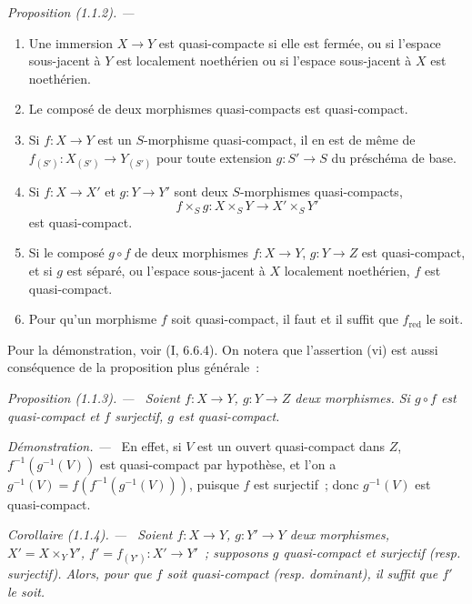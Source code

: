 \documentclass[10pt,oneside]{book}
\makeatletter
\newcommand{\setmanualcurrentlabel}[1]{\def\@currentlabel{#1}}
\newenvironment{proposition}[1][]{%
  \setmanualcurrentlabel{#1}\par\medskip\noindent\itshape Proposition (#1). ---\ }{\par}
\newenvironment{corollary}[1][]{%
  \setmanualcurrentlabel{#1}\par\medskip\noindent\itshape Corollaire (#1). ---\ }{\par}
\newenvironment{proof}{%
  \par\medskip\noindent\textit{Démonstration. ---\ }}{\par}
\makeatother
\begin{document}
\begin{proposition}[1.1.2]
\label{IV.1.1.2-fr}
\begin{enumerate}
  \item[(i)] Une immersion $X\to Y$ est quasi-compacte si elle est fermée, ou si
  l'espace sous-jacent à $Y$ est localement noethérien ou si l'espace
  sous-jacent à $X$ est noethérien.
  \item[(ii)] Le composé de deux morphismes quasi-compacts est quasi-compact.
  \item[(iii)] Si $f:X\to Y$ est un $S$-morphisme quasi-compact, il en est de même de
  $f_{(S')}:X_{(S')}\to Y_{(S')}$ pour toute extension $g:S'\to S$ du
  préschéma de base.
  \item[(iv)] Si $f:X\to X'$ et $g:Y\to Y'$ sont deux $S$-morphismes
  quasi-compacts,
  \[
    f\times_S g:X\times_S Y\to X'\times_S Y'
  \]
  est quasi-compact.
  \item[(v)] Si le composé $g\circ f$ de deux morphismes $f:X\to Y$, $g:Y\to Z$
  est quasi-compact, et si $g$ est séparé, ou l'espace sous-jacent à $X$
  localement noethérien, $f$ est quasi-compact.
  \item[(vi)] Pour qu'un morphisme $f$ soit quasi-compact, il faut et il suffit que
  $f_{\mathrm{red}}$ le soit.
\end{enumerate}
\end{proposition}

Pour la démonstration, voir (I, 6.6.4). On notera que l'assertion (vi) est
aussi conséquence de la proposition plus générale~:

\begin{proposition}[1.1.3]
\label{IV.1.1.3-fr}
Soient $f:X\to Y$, $g:Y\to Z$ deux morphismes. Si $g\circ f$ est
quasi-compact et $f$ surjectif, $g$ est quasi-compact.
\end{proposition}

\begin{proof}
En effet, si $V$ est un ouvert quasi-compact dans $Z$,
$f^{-1}(g^{-1}(V))$ est quasi-compact par hypothèse, et l'on a
$g^{-1}(V)=f(f^{-1}(g^{-1}(V)))$, puisque $f$ est surjectif~; donc
$g^{-1}(V)$ est quasi-compact.
\end{proof}

\begin{corollary}[1.1.4]
\label{IV.1.1.4-fr}
Soient $f:X\to Y$, $g:Y'\to Y$ deux morphismes, $X'=X\times_Y Y'$,
$f'=f_{(Y')}:X'\to Y'$~; supposons $g$ quasi-compact et surjectif (resp.
surjectif). Alors, pour que $f$ soit quasi-compact (resp. dominant), il suffit
que $f'$ le soit.
\end{corollary}
\end{document}
